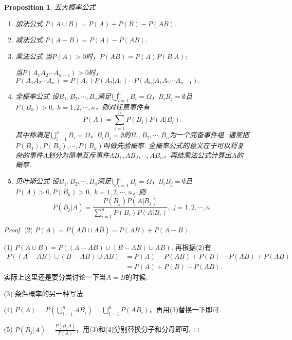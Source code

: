 \documentclass{article}
\newtheorem{proposition}[theorem]{Proposition}
\begin{document}
\begin{proposition}
\rm 五大概率公式
\begin{enumerate}
	\item {\color{red}加法公式} $P(A \cup B) = P(A) + P(B) - P(AB)$.
	\item {\color{red}减法公式} $P(A - B) = P(A) - P(AB)$.
	\item {\color{red}乘法公式} 当$P(A) > 0$时，$P(AB) = P(A)P(B|A)$;
	
	当$P(A_1A_2\cdots A_{n-1}) > 0$时，$P(A_1A_2\cdots A_n) = P(A_1)P(A_2|A_1)\cdots P(A_n|A_1A_2\cdots A_{n-1}).$
	\item {\color{red}全概率公式} 设$B_1,B_2,\cdots,B_n$满足$\bigcup\limits_{i=1}^n B_i = \Omega$，$B_iB_j = \emptyset$且$P(B_k) > 0,\; k=1,2,\cdots,n$，则对任意事件有
	$$
		P(A) = \sum\limits_{i=1}^n P(B_i)P(A|B_i).
	$$
	其中称满足$\bigcup\limits_{i=1}^n B_i = \Omega$，$B_iB_j = \emptyset$的$B_1,B_2,\cdots,B_n$为一个{\color{red}完备事件组}. 通常把$P(B_1), P(B_2),\cdots,P(B_n)$叫做{\color{red}先验概率}. {\color{blue}全概率公式的意义在于可以将复杂的事件$A$划分为简单互斥事件$AB_1,AB_2,\cdots,AB_n$，再结乘法公式计算出$A$的概率}.
	\item {\color{red}贝叶斯公式} 设$B_1,B_2,\cdots,B_n$满足$\bigcup\limits_{i=1}^n B_i = \Omega$，$B_iB_j = \emptyset$且$P(A)>0, P(B_k) > 0,\; k=1,2,\cdots,n$，则
	$$
		P(B_j | A) = \frac{P(B_j)P(A|B_j)}{\sum\limits_{i=1}^n P(B_i)P(A|B_i)},\; j = 1,2,\cdots,n.
	$$
\end{enumerate}
\end{proposition}

\begin{proof}
(2) $P(A) = P(AB \cup A\bar{B}) = P(AB)+P(A-B).$

(1) $P(A \cup B) = P((A-AB) \cup (B-AB) \cup AB)$, 再根据(2)有
$$
\begin{array}{ll}
P((A-AB) \cup (B-AB) \cup AB) &= P(A)-P(AB) + P(B) - P(AB) + P(AB) \\
&= P(A) + P(B) -P(AB).
\end{array}
$$
{\color{blue} 实际上这里还是要分类讨论一下当$A=B$的时候.}

(3) 条件概率的另一种写法.

(4) $P(A) = P(\bigcup\limits_{i=1}^n AB_i) = \bigcup\limits_{i=1}^n P(AB_i)$，再用(3)替换一下即可.

(5) $P(B_j | A) =  \frac{P(B_jA)}{P(A)}$，用(3)和(4)分别替换分子和分母即可.

\end{proof}
\end{document}
